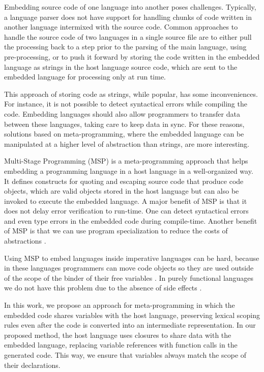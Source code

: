 \documentclass[english]{llncs}
\begin{document}
Embedding source code of one language into another poses challenges.
Typically, a language parser does not have support for handling
chunks of code written in another language intermixed with the source
code. Common approaches to handle the source code of two languages
in a single source file are to either pull the processing back to a
step prior to the parsing of the main language, using pre-processing,
or to push it forward by storing the code written in the embedded
language as strings in the host language source code, which are
sent to the embedded language for processing only at run time.

This approach of storing code as strings, while popular, has some inconveniences.
For instance, it is not possible to detect syntactical errors while compiling the code.
Embedding languages should also allow programmers to transfer data
between these languages, taking care to keep data in sync.
For these reasons, solutions based on meta-programming, where the
embedded language can be manipulated at a higher level of abstraction
than strings, are more interesting.

Multi-Stage Programming (MSP) \cite{Taha1999MSP,Taha2004gentle,Taha2008gentle}
is a meta-programming approach that helps embedding a programming language in
a host language in a well-organized way.
It defines constructs for quoting and escaping source code
that produce code objects, which are valid objects stored in the host
language but can also be invoked to execute the embedded language.
A major benefit of MSP is that it does not delay error verification to run-time.
One can detect syntactical errors and even type errors in the embedded code
during compile-time.
Another benefit of MSP is that we can use program specialization to
reduce the costs of abstractions \cite{Taha1999MSP}.

Using MSP to embed languages inside imperative languages can be hard,
because in these languages programmers can move code objects so they
are used outside of the scope of the binder of their free variables
\cite{Westbrook2010Mint}.
In purely functional languages we do not have this problem
due to the absence of side effects \cite{Kameyama2008CSS}.

In this work, we propose an approach for meta-programming
in which the embedded code shares variables with the
host language, preserving lexical scoping rules even after the code is
converted into an intermediate representation.
In our proposed method, the host language uses closures
to share data with the embedded language, replacing variable references
with function calls in the generated code.
This way, we ensure that variables always match the scope of their declarations.
\end{document}
